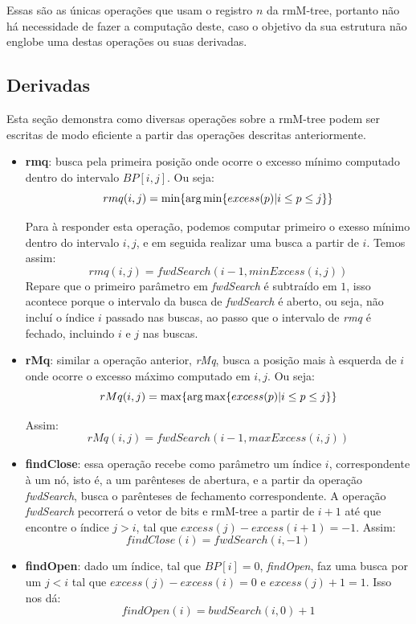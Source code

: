     Essas são as únicas operações que usam o registro $n$ da rmM-tree, portanto não há necessidade de fazer a computação deste, caso o objetivo da sua estrutura não englobe uma destas operações ou suas derivadas.

    \subsection{Derivadas}
    Esta seção demonstra como diversas operações sobre a rmM-tree podem ser escritas de modo eficiente a partir das operações descritas anteriormente.

    \begin{itemize}
        \item \textbf{rmq}: busca pela primeira posição onde ocorre o excesso mínimo computado dentro do intervalo  $BP[i,j]$. Ou seja:
            $$rmq(i,j) =\min \{ \operatorname*{arg\,min}\{excess(p) | i \leq p \leq j\}\} $$
    
        Para à responder esta operação, podemos computar primeiro o exesso mínimo dentro do intervalo $i,j$, e em seguida realizar uma busca a partir de $i$.
        Temos assim:
        $$rmq(i,j) = fwdSearch(i-1,minExcess(i,j))$$
        Repare que o primeiro parâmetro  em \textit{fwdSearch} é subtraído em $1$, isso acontece porque o intervalo da busca  de \textit{fwdSearch} é aberto, ou seja, não incluí o índice $i$ passado nas buscas, ao passo que o intervalo de \textit{rmq} é fechado, incluindo $i$ e  $j$ nas buscas. 
    
        \item \textbf{rMq}: similar a operação anterior, \textit{rMq}, busca a posição mais à esquerda de $i$ onde ocorre o excesso máximo computado em $i,j$. Ou seja:
        $$rMq(i,j) =\max\{ \operatorname*{arg\,max}\{excess(p) | i \leq p \leq j\}\} $$   
        
        Assim:
            $$rMq(i,j) = fwdSearch(i-1, maxExcess(i,j))$$


        \item \textbf{findClose}: essa operação recebe como parâmetro um índice $i$, correspondente à um nó, isto é, a um parênteses de abertura, e a partir da operação \textit{fwdSearch}, busca o parênteses de fechamento correspondente. A operação \textit{fwdSearch} pecorrerá o vetor de bits e rmM-tree a partir de $i+1$ até que encontre o índice $j > i $, tal que 
        $excess(j) - excess(i+1) = -1 $.  Assim:
        $$findClose(i) = fwdSearch(i,-1)$$
            
        \item \textbf{findOpen}:  dado um índice, tal que $BP[i]=0$, \textit{findOpen}, faz uma busca por um $j < i $ tal que $excess(j) - excess(i) = 0$ e $excess(j)+1=1$. 
        Isso nos dá:
        $$findOpen(i) = bwdSearch(i,0)+1$$
        

\end{itemize}
